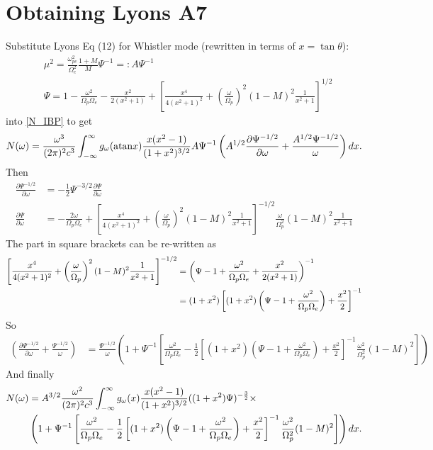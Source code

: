 \documentclass[]{article}
\begin{document}
\section{Obtaining Lyons A7}
Substitute Lyons Eq (12) for Whistler mode (rewritten in terms of $x = \tan \theta$):
\begin{align}
&\mu^2 = \frac{\omega_{pe}^2}{\Omega_c^2}\frac{1+M}{M} \Psi^{-1} =: A \Psi^{-1}\\
&\Psi = 1 - \frac{\omega^2}{\Omega_p\Omega_e} - \frac{x^2}{2(x^2 + 1)} + \left[\frac{x^4}{4(x^2+1)^2} + \left(\frac{\omega}{\Omega_p}\right)^2(1-M)^2\frac{1}{x^2 +1}\right]^{1/2}
\end{align} into \ref{N_IBP}
to get
\begin{equation}
N(\omega) = \frac{\omega^3}{(2\pi)^2 c^3} \int_{-\infty}^\infty g_\omega( \mathrm{atan} x ) 
 \frac{x (x^2-1)}{(1+x^2)^{3/2}} A \Psi^{-1}
  \left( A^{1/2}\frac{\partial  \Psi^{-1/2}}{\partial \omega} + \frac {A^{1/2}\Psi^{-1/2}}{\omega}\right) d x .
\end{equation} Then
\begin{align}
\frac{\partial \Psi^{-1/2}}{\partial \omega} &= -\frac{1}{2}\Psi^{-3/2} \frac{\partial \Psi}{\partial \omega}\\
 \frac{\partial \Psi}{\partial \omega} &= -\frac{2 \omega}{\Omega_p\Omega_e} + \left[\frac{x^4}{4(x^2+1)^2} + \left(\frac{\omega}{\Omega_p}\right)^2(1-M)^2\frac{1}{x^2 +1}\right]^{-1/2}\frac{\omega}{\Omega_p^2}(1-M)^2 \frac{1}{x^2+1}
 \end{align}
 The part in square brackets can be re-written as 
\begin{align}
 \left[\frac{x^4}{4(x^2+1)^2} + \left(\frac{\omega}{\Omega_p}\right)^2(1-M)^2\frac{1}{x^2 +1}\right]^{-1/2} &= \left( \Psi - 1 + \frac{\omega^2}{\Omega_p\Omega_e} + \frac{x^2}{2(x^2+1)}\right)^{-1}\notag\\
 &=(1+x^2) \left[(1+x^2)\left(\Psi - 1 + \frac{\omega^2}{\Omega_p\Omega_e}\right) + \frac{x^2}{2}\right]^{-1}
\end{align}
So
\begin{align}
\left(\frac{\partial  \Psi^{-1/2}}{\partial \omega} + \frac {\Psi^{-1/2}}{\omega}\right) &= \frac{\Psi^{-1/2}}{\omega} \left( 1 +\Psi^{-1} \left[  \frac{ \omega^2}{\Omega_p\Omega_e} - \frac{1}{2}\left[(1+x^2)\left(\Psi - 1 + \frac{\omega^2}{\Omega_p\Omega_e}\right) + \frac{x^2}{2}\right]^{-1} \frac{\omega^2}{\Omega_p^2}(1-M)^2  \right] \right)
\end{align}
And finally
\begin{align}
N(\omega) &= A^{3/2}\frac{\omega^2}{(2\pi)^2 c^3} \int_{-\infty}^\infty g_\omega( x ) 
 \frac{x (x^2-1)}{(1+x^2)^{3/2}} ((1+x^2) \Psi)^{-\frac{3}{2}}\times\notag\\
& \left( 1 +\Psi^{-1} \left[  \frac{ \omega^2}{\Omega_p\Omega_e} - \frac{1}{2}\left[(1+x^2)\left(\Psi - 1 + \frac{\omega^2}{\Omega_p\Omega_e}\right) + \frac{x^2}{2}\right]^{-1} \frac{\omega^2}{\Omega_p^2}(1-M)^2  \right] \right)
d x .
\end{align} 
\end{document}
